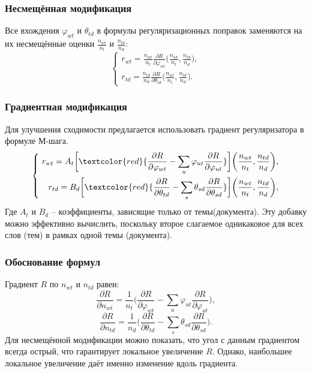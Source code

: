 \documentclass[utf8]{beamer}
\renewcommand{\phi}{\varphi}
\begin{document}
\begin{frame}
\frametitle{Несмещённая модификация}
Все вхождения $\phi_{wt}$ и $\theta_{td}$ в формулы регуляризационных поправок заменяются на их несмещённые оценки $\frac{n_{wt}}{n_t}$ и $\frac{n_{td}}{n_d}$:
\[
\left\{
	\begin{aligned}
		r_{wt} =  \frac{n_{wt}}{n_t} \frac{\partial{R}}{\partial{\phi_{wt}}} \bigg(\frac{n_{wt}}{n_t}, \frac{n_{td}}{n_d}\bigg),\\
		r_{td} = \frac{n_{td}}{n_d} \frac{\partial{R}}{\partial{\theta_{td}}} \bigg(\frac{n_{wt}}{n_t}, \frac{n_{td}}{n_d}\bigg).
	\end{aligned}
\right.
\]
\end{frame}

	
\begin{frame}
\frametitle{Градиентная модификация}
Для улучшения сходимости предлагается использовать градиент регуляризатора в формуле М-шага.
\[
\left\{\
	\begin{aligned}
		r_{wt} =  A_t \bigg[\textcolor{red} {\frac{\partial{R}}{\partial{\phi_{wt}}} - \sum\limits_u \phi_{ut} \frac{\partial{R}}{\partial{\phi_{ut}}} }\bigg] \bigg(\frac{n_{wt}}{n_t}, \frac{n_{td}}{n_d}\bigg),\\
		r_{td} =  B_d \bigg[ \textcolor{red} {\frac{\partial{R}}{\partial{\theta_{td}}} - \sum\limits_s \theta_{sd} \frac{\partial{R}}{\partial{\theta_{sd}}} }\bigg] \bigg(\frac{n_{wt}}{n_t}, \frac{n_{td}}{n_d}\bigg),
	\end{aligned}
\right.
\]
Где $A_t$ и $B_d$ -- коэффициенты, зависящие только от темы(документа). Эту добавку можно эффективно вычислить, поскольку второе слагаемое одникаковое для всех слов (тем) в рамках одной темы (документа).
\end{frame}


\begin{frame}
\frametitle{Обоснование формул}
Градиент $R$ по $n_{wt}$ и $n_{td}$ равен:
\[
\frac{\partial{R}}{\partial{n_{wt}}} = \frac{1}{n_t} \bigg(\frac{\partial{R}}{\partial{\phi_{wt}}} - \sum\limits_u \phi_{ut} \frac{\partial{R}}{\partial{\phi_{ut}}}\bigg),
\]
\[
\frac{\partial{R}}{\partial{n_{td}}} = \frac{1}{n_d} \bigg( \frac{\partial{R}}{\partial{\theta_{td}}} - \sum\limits_s \theta_{sd} \frac{\partial{R}}{\partial{\theta_{sd}}} \bigg).
\]
Для несмещённой модификации можно показать, что угол с данным градиентом всегда острый, что гарантирует локальное увеличение $R$. Однако, наибольшее локальное увеличение даёт именно изменение вдоль градиента.
\end{frame}
\end{document}
